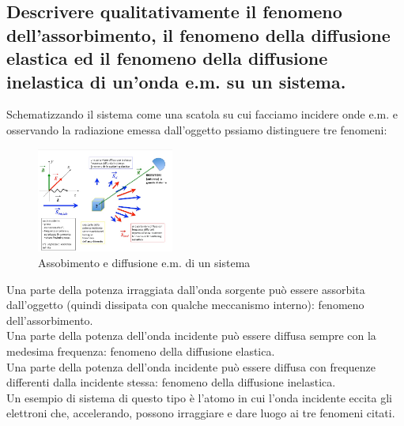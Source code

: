 \subsection[ Assorbimento, diffusione di onda E.M.]{Descrivere qualitativamente il fenomeno dell'assorbimento, il fenomeno della diffusione elastica ed il fenomeno della diffusione inelastica di un'onda e.m. su un sistema.}
Schematizzando il sistema come una scatola su cui facciamo incidere onde e.m. e osservando la radiazione emessa dall'oggetto pssiamo distinguere tre fenomeni:
\begin{figure}[H]
	\centering
	\includegraphics[width=0.4\textwidth]{immagini/1.png}
	\caption{Assobimento e diffusione e.m. di un sistema}
	\label{fig:1}
\end{figure}
Una parte della potenza irraggiata dall'onda sorgente può essere assorbita dall'oggetto (quindi dissipata con qualche meccanismo interno): fenomeno dell'assorbimento.\\
Una parte della potenza dell'onda incidente può essere diffusa sempre con la medesima frequenza: fenomeno della diffusione elastica.\\
Una parte della potenza dell'onda incidente può essere diffusa con frequenze differenti dalla incidente stessa: fenomeno della diffusione inelastica.\\
Un esempio di sistema di questo tipo è l'atomo in cui l'onda incidente eccita gli elettroni che, accelerando, possono irraggiare e dare luogo ai tre fenomeni citati.

